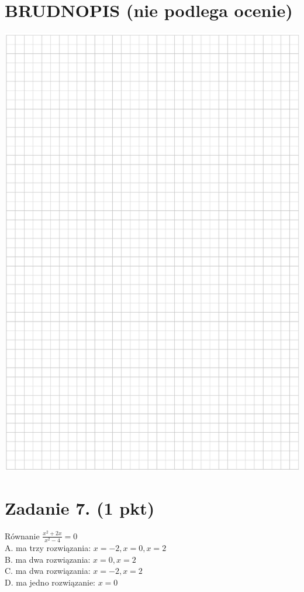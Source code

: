 \documentclass[10pt]{article}
\begin{document}
\section*{BRUDNOPIS (nie podlega ocenie)}
\begin{center}
\includegraphics[max width=\textwidth]{2024_11_21_9383c97fb44abf35abe9g-03}
\end{center}

\section*{Zadanie 7. (1 pkt)}
Równanie \(\frac{x^{2}+2 x}{x^{2}-4}=0\)\\
A. ma trzy rozwiązania: \(x=-2, x=0, x=2\)\\
B. ma dwa rozwiązania: \(x=0, x=2\)\\
C. ma dwa rozwiązania: \(x=-2, x=2\)\\
D. ma jedno rozwiązanie: \(x=0\)
\end{document}
